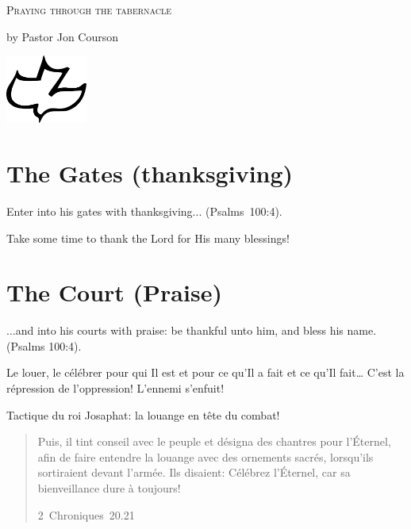 \begin{center}
\mbox{}

\bigskip

\LARGE\textsc{Praying through the tabernacle}

\vspace{2ex plus \fill}

\large{by Pastor Jon Courson}

\vspace{3ex plus \fill}

\includegraphics[width=0.2\textwidth]{colombe.pdf}

\vspace{0ex plus \fill}


\mbox{}
\end{center}

\pagestyle{empty}
\setlength{\parindent}{0em}

\section{The Gates (thanksgiving)}

Enter into his gates with thanksgiving... (Psalms~100:4).

Take some time to thank the Lord for His many blessings!


\section{The Court (Praise)}

...and into his courts with praise: be thankful unto him, and bless his name. (Psalms 100:4).

Le louer, le célébrer pour qui Il est et pour ce qu'Il a fait et ce qu'Il fait\dots{} C'est la répression de l'oppression! L'ennemi s'enfuit!

Tactique du roi Josaphat:  la louange en tête du combat!

\begin{quote}
\og Puis, il tint conseil avec le peuple et désigna des chantres pour l’Éternel, afin de faire entendre la louange avec des ornements sacrés, lorsqu’ils sortiraient devant l’armée. Ils disaient: Célébrez l’Éternel, car sa bienveillance dure à toujours! \fg{}

\raggedleft\small 2~Chroniques~20.21
\end{quote}


